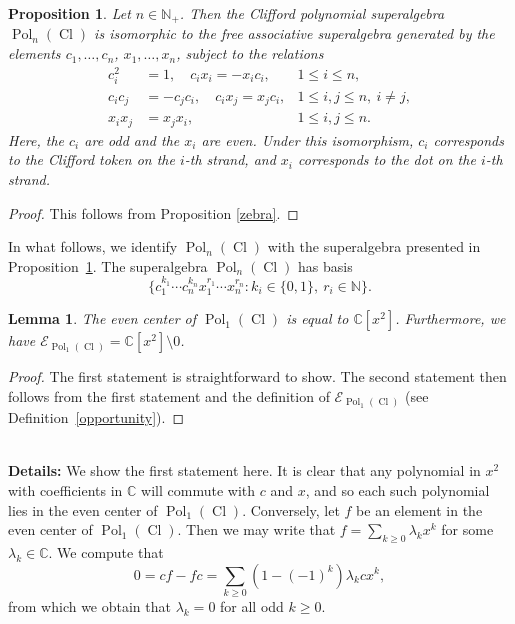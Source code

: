 \documentclass[11pt]{amsart}
\newcommand{\details}[1]{
      \ \\
      {\color{OliveGreen}
        \textbf{Details:} #1
      }
      \\
  }
\newcommand{\details}[1]{}
\newtheorem{prop}[theo]{Proposition}
\newtheorem{lem}[theo]{Lemma}
\theoremstyle{definition}
\numberwithin{equation}{section}
\begin{document}
\begin{prop} \label{racing}
Let $ n \in \mathbb{N}_{+} $. Then the Clifford polynomial superalgebra $ \operatorname{Pol}_{n}(\operatorname{Cl}) $ is isomorphic to the free associative superalgebra generated by the elements $ c_{1},\ldots, c_{n} $, $ x_{1},\ldots,x_{n} $, subject to the relations 
\begin{align}
c_{i}^{2} &= 1, \quad c_{i}x_{i} = -x_{i}c_{i}, & 1 \leq i \leq n, \label{tophat1}
\\ c_{i}c_{j} &= -c_{j}c_{i}, \quad c_{i}x_{j} = x_{j}c_{i}, & 1 \leq i,j \leq n, \ i \neq j, \label{tophat3}
\\ x_{i}x_{j} &= x_{j}x_{i}, & 1 \leq i,j \leq n. \label{tophat5}
\end{align}
Here, the $ c_{i} $ are odd and the $ x_{i} $ are even. Under this isomorphism, $ c_{i} $ corresponds to the Clifford token on the \(i\)-th strand, and $ x_{i} $ corresponds to the dot on the \(i\)-th strand.
\end{prop}

\begin{proof}
This follows from Proposition \ref{zebra}.
\end{proof}

In what follows, we identify $ \operatorname{Pol}_{n}(\operatorname{Cl}) $ with the superalgebra presented in Proposition~\ref{racing}. The superalgebra $ \operatorname{Pol}_{n}(\operatorname{Cl}) $ has basis
\begin{equation*}
\{c_{1}^{k_{1}}\cdots c_{n}^{k_{n}}x_{1}^{r_{1}}\cdots x_{n}^{r_{n}} : k_{i} \in \{0,1\}, \ r_{i} \in \mathbb{N}\}.
\end{equation*}


\begin{lem} \label{Pol1(Cl)_even_center}
The even center of $ \operatorname{Pol}_{1}(\operatorname{Cl}) $ is equal to $ \mathbb{C}[x^{2}] $. Furthermore, we have $ \mathcal{E}_{\operatorname{Pol}_{1}(\operatorname{Cl})} = \mathbb{C}[x^{2}] \setminus 0 $.
\end{lem}

\begin{proof}
The first statement is straightforward to show. The second statement then follows from the first statement and the definition of $ \mathcal{E}_{\operatorname{Pol}_{1}(\operatorname{Cl})} $ (see Definition~\ref{opportunity}).
\end{proof}

\details{We show the first statement here. It is clear that any polynomial in $ x^{2} $ with coefficients in $ \mathbb{C} $ will commute with $ c $ and $ x $, and so each such polynomial lies in the even center of $ \operatorname{Pol}_{1}(\operatorname{Cl}) $. Conversely, let \(f\) be an element in the even center of $ \operatorname{Pol}_{1}(\operatorname{Cl}) $. Then we may write that $ f = \sum_{k \geq 0} \lambda_{k}x^{k} $ for some $ \lambda_{k} \in \mathbb{C} $. We compute that
\begin{equation*}
0 = cf - fc = \sum_{k \geq 0} (1-(-1)^{k})\lambda_{k}cx^{k},
\end{equation*}
from which we obtain that $ \lambda_{k} = 0 $ for all odd $ k \geq 0 $.}
\end{document}
